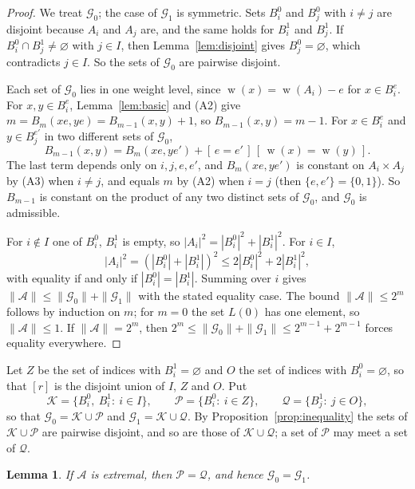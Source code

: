 \documentclass[screen]{aomart}
\newtheorem{lemma}[theorem]{Lemma}
\theoremstyle{definition}
\theoremstyle{remark}
\numberwithin{equation}{section}
\newcommand{\cA}{\mathcal{A}}
\newcommand{\cG}{\mathcal{G}}
\newcommand{\cK}{\mathcal{K}}
\newcommand{\cP}{\mathcal{P}}
\newcommand{\cQ}{\mathcal{Q}}
\newcommand{\Iv}[1]{[\,#1\,]}
\DeclareMathOperator{\wt}{w}
\begin{document}
\begin{proof}
We treat $\cG_0$; the case of $\cG_1$ is symmetric. Sets $B_i^0$ and $B_j^0$ with $i\ne j$ are disjoint because $A_i$ and $A_j$ are, and the same holds for $B_i^1$ and $B_j^1$. If $B_i^0\cap B_j^1\ne\varnothing$ with $j\in I$, then Lemma~\ref{lem:disjoint} gives $B_j^0=\varnothing$, which contradicts $j\in I$. So the sets of $\cG_0$ are pairwise disjoint.

Each set of $\cG_0$ lies in one weight level, since $\wt(x)=\wt(A_i)-e$ for $x\in B_i^e$. For $x,y\in B_i^e$, Lemma~\ref{lem:basic} and (A2) give $m=B_m(xe,ye)=B_{m-1}(x,y)+1$, so $B_{m-1}(x,y)=m-1$. For $x\in B_i^e$ and $y\in B_j^{e'}$ in two different sets of $\cG_0$,
\[
B_{m-1}(x,y)=B_m(xe,ye')+\Iv{e=e'}\,\Iv{\wt(x)=\wt(y)} .
\]
The last term depends only on $i,j,e,e'$, and $B_m(xe,ye')$ is constant on $A_i\times A_j$ by (A3) when $i\ne j$, and equals $m$ by (A2) when $i=j$ (then $\{e,e'\}=\{0,1\}$). So $B_{m-1}$ is constant on the product of any two distinct sets of $\cG_0$, and $\cG_0$ is admissible.

For $i\notin I$ one of $B_i^0$, $B_i^1$ is empty, so $|A_i|^2=|B_i^0|^2+|B_i^1|^2$. For $i\in I$,
\[
|A_i|^2=(|B_i^0|+|B_i^1|)^2\le 2|B_i^0|^2+2|B_i^1|^2 ,
\]
with equality if and only if $|B_i^0|=|B_i^1|$. Summing over $i$ gives $\|\cA\|\le\|\cG_0\|+\|\cG_1\|$ with the stated equality case. The bound $\|\cA\|\le2^m$ follows by induction on $m$; for $m=0$ the set $L(0)$ has one element, so $\|\cA\|\le1$. If $\|\cA\|=2^m$, then $2^m\le\|\cG_0\|+\|\cG_1\|\le 2^{m-1}+2^{m-1}$ forces equality everywhere.
\end{proof}

Let $Z$ be the set of indices with $B_i^1=\varnothing$ and $O$ the set of indices with $B_i^0=\varnothing$, so that $[r]$ is the disjoint union of $I$, $Z$ and $O$. Put
\[
\cK=\{B_i^0,\ B_i^1:\ i\in I\},\qquad \cP=\{B_i^0:\ i\in Z\},\qquad \cQ=\{B_j^1:\ j\in O\},
\]
so that $\cG_0=\cK\cup\cP$ and $\cG_1=\cK\cup\cQ$. By Proposition~\ref{prop:inequality} the sets of $\cK\cup\cP$ are pairwise disjoint, and so are those of $\cK\cup\cQ$; a set of $\cP$ may meet a set of $\cQ$.

\begin{lemma}\label{lem:merge}
If $\cA$ is extremal, then $\cP=\cQ$, and hence $\cG_0=\cG_1$.
\end{lemma}
\end{document}
